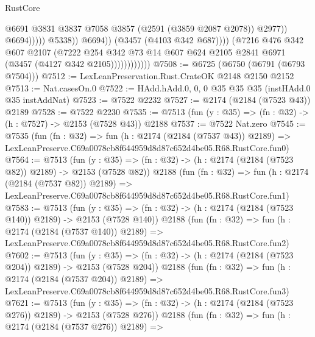 \begin{lexlean}{RustCore}
\begin{coremodule}
                                              @6691
                                              @3831
                                              @3837
                                              @7058
                                              @3857
                                              (@2591 (@3859 @2087 @2078))
                                              @2977))
                                          @6694)))))
                                @5338))
                            @6694))
                        (@3457 (@4103 @342 @687))))
                    (@7216
                      @476
                      @342
                      @607
                      @2107
                      (@7222
                        @254
                        @342
                        @73
                        @14
                        @607
                        @624
                        @2105
                        @2841
                        @6971
                        (@3457 (@4127 @342 @2105))))))))))))
@7508 := @6725 (@6750 (@6791 (@6793 @7504)))
@7512 := LexLeanPreservation.Rust.CrateOK @2148 @2150 @2152
@7513 := Nat.casesOn.{0}
@7522 := HAdd.hAdd.{0, 0, 0} @35 @35 @35 (instHAdd.{0} @35 instAddNat)
@7523 := @7522 @2232
@7527 := @2174 (@2184 (@7523 @43)) @2189
@7528 := @7522 @2230
@7535 := @7513 (fun (y : @35) => (fn : @32) -> (h : @7527) -> @2153 (@7528 @43)) @2188
@7537 := @7522 Nat.zero
@7545 := @7535
    (fun (fn : @32) =>
    fun (h : @2174 (@2184 (@7537 @43)) @2189) =>
    LexLeanPreserve.C69a0078cb8f644959d8d87c652d4be05.R68.RustCore.fun0)
@7564 := @7513
    (fun (y : @35) => (fn : @32) -> (h : @2174 (@2184 (@7523 @82)) @2189) -> @2153 (@7528 @82))
    @2188
    (fun (fn : @32) =>
    fun (h : @2174 (@2184 (@7537 @82)) @2189) =>
    LexLeanPreserve.C69a0078cb8f644959d8d87c652d4be05.R68.RustCore.fun1)
@7583 := @7513
    (fun (y : @35) => (fn : @32) -> (h : @2174 (@2184 (@7523 @140)) @2189) -> @2153 (@7528 @140))
    @2188
    (fun (fn : @32) =>
    fun (h : @2174 (@2184 (@7537 @140)) @2189) =>
    LexLeanPreserve.C69a0078cb8f644959d8d87c652d4be05.R68.RustCore.fun2)
@7602 := @7513
    (fun (y : @35) => (fn : @32) -> (h : @2174 (@2184 (@7523 @204)) @2189) -> @2153 (@7528 @204))
    @2188
    (fun (fn : @32) =>
    fun (h : @2174 (@2184 (@7537 @204)) @2189) =>
    LexLeanPreserve.C69a0078cb8f644959d8d87c652d4be05.R68.RustCore.fun3)
@7621 := @7513
    (fun (y : @35) => (fn : @32) -> (h : @2174 (@2184 (@7523 @276)) @2189) -> @2153 (@7528 @276))
    @2188
    (fun (fn : @32) =>
    fun (h : @2174 (@2184 (@7537 @276)) @2189) =>

\end{coremodule}
\end{lexlean}
